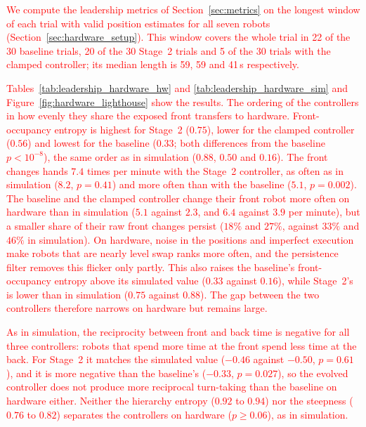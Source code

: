 \documentclass[runningheads]{llncs}
\newcommand{\rev}[1]{\textcolor{red}{#1}}
\begin{document}
\rev{We compute the leadership metrics of Section~\ref{sec:metrics} on the longest window of each trial with valid position estimates for all seven robots (Section~\ref{sec:hardware_setup}).} \rev{This window covers the whole trial in 22 of the 30 baseline trials, 20 of the 30 Stage~2 trials and 5 of the 30 trials with the clamped controller; its median length is 59, 59 and 41\,s respectively.}

\rev{Tables~\ref{tab:leadership_hardware_hw} and \ref{tab:leadership_hardware_sim} and Figure~\ref{fig:hardware_lighthouse} show the results.} \rev{The ordering of the controllers in how evenly they share the exposed front transfers to hardware.} \rev{Front-occupancy entropy is highest for Stage~2 ($0.75$), lower for the clamped controller ($0.56$) and lowest for the baseline ($0.33$; both differences from the baseline $p < 10^{-8}$), the same order as in simulation ($0.88$, $0.50$ and $0.16$).} \rev{The front changes hands $7.4$ times per minute with the Stage~2 controller, as often as in simulation ($8.2$, $p = 0.41$) and more often than with the baseline ($5.1$, $p = 0.002$).} \rev{The baseline and the clamped controller change their front robot more often on hardware than in simulation ($5.1$ against $2.3$, and $6.4$ against $3.9$ per minute), but a smaller share of their raw front changes persist ($18\%$ and $27\%$, against $33\%$ and $46\%$ in simulation).} \rev{On hardware, noise in the positions and imperfect execution make robots that are nearly level swap ranks more often, and the persistence filter removes this flicker only partly.} \rev{This also raises the baseline's front-occupancy entropy above its simulated value ($0.33$ against $0.16$), while Stage~2's is lower than in simulation ($0.75$ against $0.88$).} \rev{The gap between the two controllers therefore narrows on hardware but remains large.}

\rev{As in simulation, the reciprocity between front and back time is negative for all three controllers: robots that spend more time at the front spend less time at the back.} \rev{For Stage~2 it matches the simulated value ($-0.46$ against $-0.50$, $p = 0.61$), and it is more negative than the baseline's ($-0.33$, $p = 0.027$), so the evolved controller does not produce more reciprocal turn-taking than the baseline on hardware either.} \rev{Neither the hierarchy entropy ($0.92$ to $0.94$) nor the steepness ($0.76$ to $0.82$) separates the controllers on hardware ($p \geq 0.06$), as in simulation.}
\end{document}
